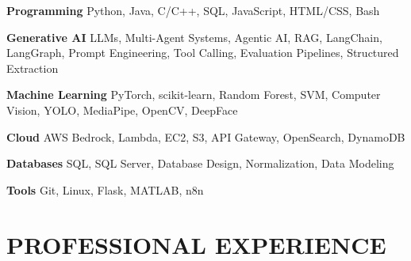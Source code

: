\documentclass[10pt,a4paper,sans]{moderncv}
\begin{document}
\textbf{Programming}
Python, Java, C/C++, SQL, JavaScript, HTML/CSS, Bash

\textbf{Generative AI}
LLMs, Multi-Agent Systems, Agentic AI, RAG,
LangChain, LangGraph,
Prompt Engineering,
Tool Calling,
Evaluation Pipelines,
Structured Extraction

\textbf{Machine Learning}
PyTorch,
scikit-learn,
Random Forest,
SVM,
Computer Vision,
YOLO,
MediaPipe,
OpenCV,
DeepFace

\textbf{Cloud}
AWS Bedrock,
Lambda,
EC2,
S3,
API Gateway,
OpenSearch,
DynamoDB

\textbf{Databases}
SQL,
SQL Server,
Database Design,
Normalization,
Data Modeling

\textbf{Tools}
Git,
Linux,
Flask,
MATLAB,
n8n


\vspace*{-3mm}
\section{PROFESSIONAL  EXPERIENCE}
\end{document}
